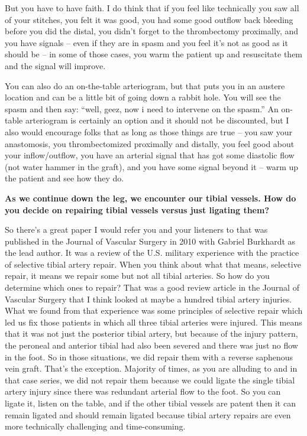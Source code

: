 \documentclass[
]{book}
\begin{document}
But you have to have faith. I do think that if you feel like technically
you saw all of your stitches, you felt it was good, you had some good
outflow back bleeding before you did the distal, you didn't forget to
the thrombectomy proximally, and you have signals -- even if they are in
spasm and you feel it's not as good as it should be -- in some of those
cases, you warm the patient up and resuscitate them and the signal will
improve.

You can also do an on-the-table arteriogram, but that puts you in an
austere location and can be a little bit of going down a rabbit hole.
You will see the spasm and then say: ``well, geez, now i need to
intervene on the spasm.'' An on-table arteriogram is certainly an option
and it should not be discounted, but I also would encourage folks that
as long as those things are true -- you saw your anastomosis, you
thrombectomized proximally and distally, you feel good about your
inflow/outflow, you have an arterial signal that has got some diastolic
flow (not water hammer in the graft), and you have some signal beyond it
-- warm up the patient and see how they do.

\textbf{As we continue down the leg, we encounter our tibial vessels. How do
you decide on repairing tibial vessels versus just ligating them?}

So there's a great paper I would refer you and your listeners to that
was published in the Journal of Vascular Surgery in 2010 with Gabriel
Burkhardt as the lead author.\citep{burkhardt2010} It was a review of the
U.S. military experience with the practice of selective tibial artery
repair. When you think about what that means, selective repair, it means
we repair some but not all tibial arteries. So how do you determine
which ones to repair? That was a good review article in the Journal of
Vascular Surgery that I think looked at maybe a hundred tibial artery
injuries. What we found from that experience was some principles of
selective repair which led us fix those patients in which all three
tibial arteries were injured. This means that it was not just the
posterior tibial artery, but because of the injury pattern, the peroneal
and anterior tibial had also been severed and there was just no flow in
the foot. So in those situations, we did repair them with a reverse
saphenous vein graft. That's the exception. Majority of times, as you
are alluding to and in that case series, we did not repair them because
we could ligate the single tibial artery injury since there was
redundant arterial flow to the foot. So you can ligate it, listen on the
table, and if the other tibial vessels are patent then it can remain
ligated and should remain ligated because tibial artery repairs are even
more technically challenging and time-consuming.
\end{document}
